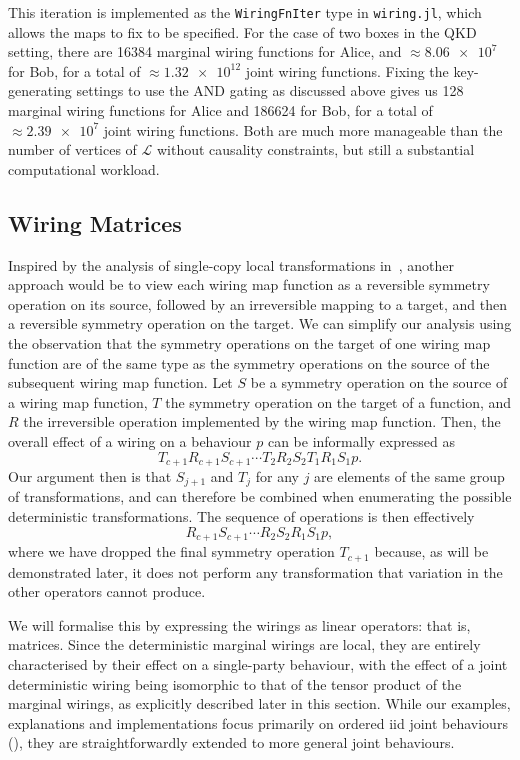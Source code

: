 \documentclass[10pt, a4paper]{article}
\numberwithin{equation}{section} %
\theoremstyle{definition}
\theoremstyle{plain}
\newcommand{\?}{\mathrel{?}} %
\newcommand{\Ls}{\mathcal{L}}
\begin{document}
              This iteration is implemented as the \verb`WiringFnIter` type in \verb`wiring.jl`, which allows the maps to fix to be specified. For the case of two boxes in the QKD setting, there are 16384 marginal wiring functions for Alice, and \(\approx \num{8.06e7}\) for Bob, for a total of \(\approx \num{1.32e12}\) joint wiring functions. Fixing the key-generating settings to use the AND gating as discussed above gives us 128 marginal wiring functions for Alice and 186624 for Bob, for a total of \(\approx \num{2.39e7}\) joint wiring functions. Both are much more manageable than the number of vertices of \(\Ls\) without causality constraints, but still a substantial computational workload.

              \subsection{Wiring Matrices}\label{sec:locwir_mat}

              Inspired by the analysis of single-copy local transformations in~\cite{LocalTransformations}, another approach would be to view each wiring map function as a reversible symmetry operation on its source, followed by an irreversible mapping to a target, and then a reversible symmetry operation on the target. We can simplify our analysis using the observation that the symmetry operations on the target of one wiring map function are of the same type as the symmetry operations on the source of the subsequent wiring map function. Let \(S\) be a symmetry operation on the source of a wiring map function, \(T\) the symmetry operation on the target of a function, and \(R\) the irreversible operation implemented by the wiring map function. Then, the overall effect of a wiring on a behaviour \(p\) can be informally expressed as
              \[ T_{c+1}R_{c+1}S_{c+1} \cdots T_2R_2S_2 T_1R_1S_1 p. \]
              Our argument then is that \(S_{j+1}\) and \(T_{j}\) for any \(j\) are elements of the same group of transformations, and can therefore be combined when enumerating the possible deterministic transformations. The sequence of operations is then effectively
              \[ R_{c+1}S_{c+1} \cdots R_2S_2 R_1S_1 p, \]
              where we have dropped the final symmetry operation \(T_{c+1}\) because, as will be demonstrated later, it does not perform any transformation that variation in the other operators cannot produce.

              We will formalise this by expressing the wirings as linear operators: that is, matrices. Since the deterministic marginal wirings are local, they are entirely characterised by their effect on a single-party behaviour, with the effect of a joint deterministic wiring being isomorphic to that of the tensor product of the marginal wirings, as explicitly described later in this section. While our examples, explanations and implementations focus primarily on ordered iid joint behaviours (), they are straightforwardly extended to more general joint behaviours.
\end{document}
